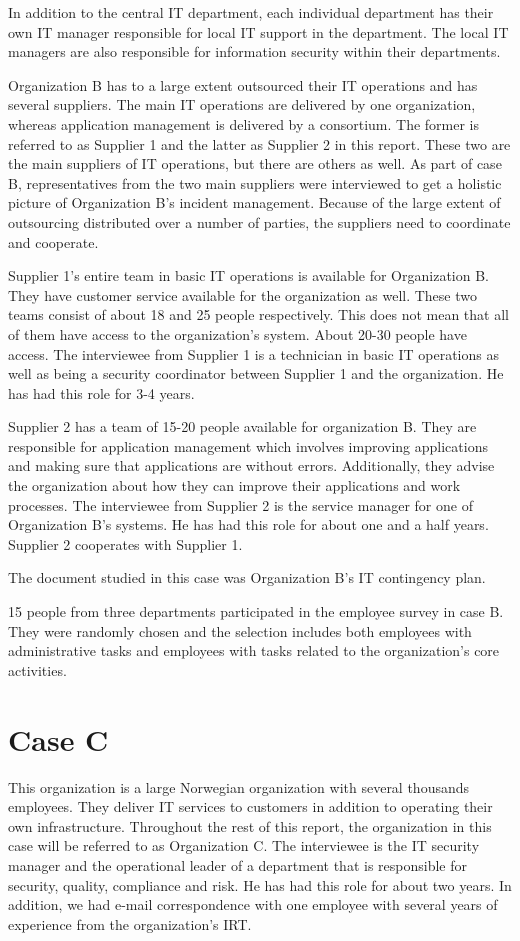 In addition to the central IT department, %
each individual department has their own IT manager responsible for local IT support in the department. The local IT managers are also responsible for information security within their departments.

Organization B has to a large extent outsourced their IT operations and has several suppliers. The main IT operations are delivered by one organization, whereas application management is delivered by a consortium. The former is referred to as Supplier 1 and the latter as Supplier 2 in this report. These two are the main suppliers of IT operations, but there are others as well. As part of case B, representatives from the two main suppliers were interviewed to get a holistic picture of Organization B's incident management. Because of the large extent of outsourcing distributed over a number of parties, the suppliers need to coordinate and cooperate. 

Supplier 1's entire team in basic IT operations is available for Organization B. They have customer service available for the organization as well. These two teams consist of about 18 and 25 people respectively. This does not mean that all of them have access to the organization's system. About 20-30 people have access. The interviewee from Supplier 1 is a technician in basic IT operations as well as being a security coordinator between Supplier 1 and the organization. He has had this role for 3-4 years.

Supplier 2 has a team of 15-20 people available for organization B. They are responsible for application management which involves improving applications and making sure that applications are without errors. Additionally, they advise the organization about how they can improve their applications and work processes. The interviewee from Supplier 2 is the service manager for one of Organization B's systems. He has had this role for about one and a half years. Supplier 2 cooperates with Supplier 1.

The document studied in this case was Organization B's IT contingency plan.

15 people from three departments participated in the employee survey in case B. They were randomly chosen and the selection includes both employees with administrative tasks and employees with tasks related to the organization's core activities.

\section{Case C}
This organization is a large Norwegian organization with several thousands employees. They deliver IT services to customers in addition to operating their own infrastructure. Throughout the rest of this report, the organization in this case will be referred to as Organization C. The interviewee is the IT security manager  and the operational leader of a department that is responsible for security, quality, compliance and risk. He has had this role for about two years. In addition, we had e-mail correspondence with one employee with several years of experience from the organization's IRT.

